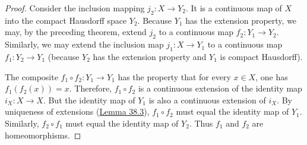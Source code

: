 \begin{proof}
 Consider the inclusion mapping \(j_{2} : X \rightarrow {Y}_{2}\). It is a continuous map of \(X\) into the compact Hausdorff space \(Y_{2}\). Because \(Y_{1}\) has the extension property, we may, by the preceding theorem, extend \(j_{2}\) to a continuous map \(f_{2} : Y_{1} \rightarrow {Y}_{2}\). Similarly, we may extend the inclusion map \(j_{1} : X \rightarrow {Y}_{1}\) to a continuous map \(f_{1} : Y_{2} \rightarrow {Y}_{1}\) (because \(Y_{2}\) has the extension property and \(Y_{1}\) is compact Hausdorff).
\par\nopagebreak
\begin{center}
	\label{fig:com_37_3}
\end{center}
\par\nopagebreak

The composite \(f_{1} \circ {f}_{2} : Y_{1} \rightarrow {Y}_{1}\) has the property that for every \(x \in X\), one has \(f_{1}( {f_{2}(x) }) = x\). Therefore, \(f_{1} \circ {f}_{2}\) is a continuous extension of the identity map \(i_{X} : X \rightarrow X\). But the identity map of \(Y_{1}\) is also a continuous extension of \(i_{X}\). By uniqueness of extensions (\hyperref[lem:38.3]{Lemma 38.3}), \(f_{1} \circ {f}_{2}\) must equal the identity map of \(Y_{1}\). Similarly, \(f_{2} \circ {f}_{1}\) must equal the identity map of \(Y_{2}\). Thus \(f_{1}\) and \(f_{2}\) are homeomorphisms.
\end{proof}
